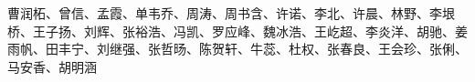 \documentclass[11pt]{book} %
\begin{document}
\newpage
~\vfill
\thispagestyle{empty}

{\large
{} \\

\noindent 曹润柘、曾信、孟霞、单韦乔、周涛、周书含、许诺、李北、许晨、林野、李垠桥、王子扬、刘辉、张裕浩、冯凯、罗应峰、魏冰浩、王屹超、李炎洋、胡驰、姜雨帆、田丰宁、刘继强、张哲旸、陈贺轩、牛蕊、杜权、张春良、王会珍、张俐、马安香、胡明涵 \\

}

\newpage


{} %
\pagestyle{empty} %
\tableofcontents %
\cleardoublepage %
\pagestyle{fancy} %


























\cleardoublepage %
\printbibliography
\end{document}
